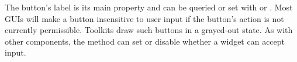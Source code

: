 The button's label is its main property and can be queried or set with
 or .  Most
GUIs will make a button insensitive to user input if the button's
action is not currently permissible. Toolkits draw such buttons in a
grayed-out state. As with other components, the  method can set
or disable whether a widget can accept input.










